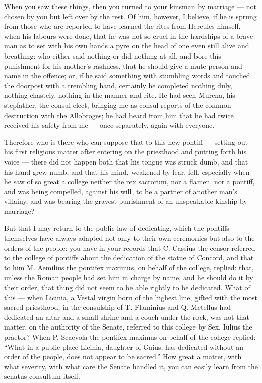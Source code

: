  When you saw these things, then you turned to your kinsman by marriage --- not chosen by you but left over by the rest. Of him, however, I believe, if he is sprung from those who are reported to have learned the rites from Hercules himself, when his labours were done, that he was not so cruel in the hardships of a brave man as to set with his own hands a pyre on the head of one even still alive and breathing: who either said nothing or did nothing at all, and bore this punishment for his mother's rashness, that he should give a mute person and name in the offence; or, if he said something with stumbling words and touched the doorpost with a trembling hand, certainly he completed nothing duly, nothing chastely, nothing in the manner and rite. He had seen Murena, his stepfather, the consul-elect, bringing me as consul reports of the common destruction with the Allobroges; he had heard from him that he had twice received his safety from me --- once separately, again with everyone.

 Therefore who is there who can suppose that to this new pontiff --- setting out his first religious matter after entering on the priesthood and putting forth his voice --- there did not happen both that his tongue was struck dumb, and that his hand grew numb, and that his mind, weakened by fear, fell, especially when he saw of so great a college neither the rex sacrorum, nor a flamen, nor a pontiff, and was being compelled, against his will, to be a partner of another man's villainy, and was bearing the gravest punishment of an unspeakable kinship by marriage?

 But that I may return to the public law of dedicating, which the pontiffs themselves have always adapted not only to their own ceremonies but also to the orders of the people: you have in your records that C. Cassius the censor referred to the college of pontiffs about the dedication of the statue of Concord, and that to him M. Aemilius the pontifex maximus, on behalf of the college, replied: that, unless the Roman people had set him in charge by name, and he should do it by their order, that thing did not seem to be able rightly to be dedicated. What of this --- when Licinia, a Vestal virgin born of the highest line, gifted with the most sacred priesthood, in the consulship of T. Flaminius and Q. Metellus had dedicated an altar and a small shrine and a couch under the rock, was not that matter, on the authority of the Senate, referred to this college by Sex. Iulius the praetor? When P. Scaevola the pontifex maximus on behalf of the college replied: ``What in a public place Licinia, daughter of Gaius, has dedicated without an order of the people, does not appear to be sacred.'' How great a matter, with what severity, with what care the Senate handled it, you can easily learn from the senatus consultum itself.

